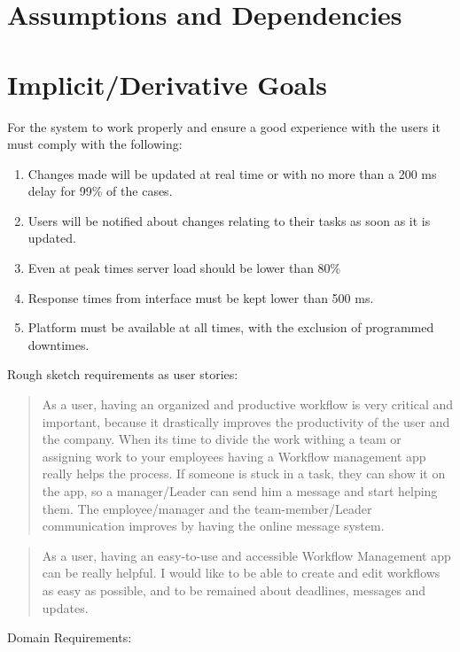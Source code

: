 \documentclass{article}
\begin{document}
\section{Assumptions and Dependencies}
\vspace{100}

\section{Implicit/Derivative Goals}
\vspace{10}
For the system to work properly and ensure a good experience with the users it must comply with the following:
\begin{enumerate}
  \item Changes made will be updated at real time or with no more than a 200 ms delay for 99\% of the cases.
  \item Users will be notified about changes relating to their tasks as soon as it is updated.
  \item Even at peak times server load should be lower than 80\%
  \item Response times from interface must be kept lower than 500 ms.
  \item Platform must be available at all times, with the exclusion of programmed downtimes.
\end{enumerate}
\vspace{10}
Rough sketch requirements as user stories:
\begin{quotation}
As a user, having an organized and productive workflow is very critical and important, because it drastically improves the productivity of the user and the company. When its time to divide the work withing a team or assigning work to your employees having a Workflow management app really helps the process. If someone is stuck in a task, they can show it on the app, so a manager/Leader can send him a message and start helping them. The employee/manager and the team-member/Leader communication improves by having the online message system.
\end{quotation}
\begin{quotation}
    As a user, having an easy-to-use and accessible Workflow Management app can be really helpful. I would like to be able to create and edit workflows as easy as possible, and to be remained about deadlines, messages and updates.
\end{quotation}
\vspace{10}
Domain Requirements:
\end{document}
